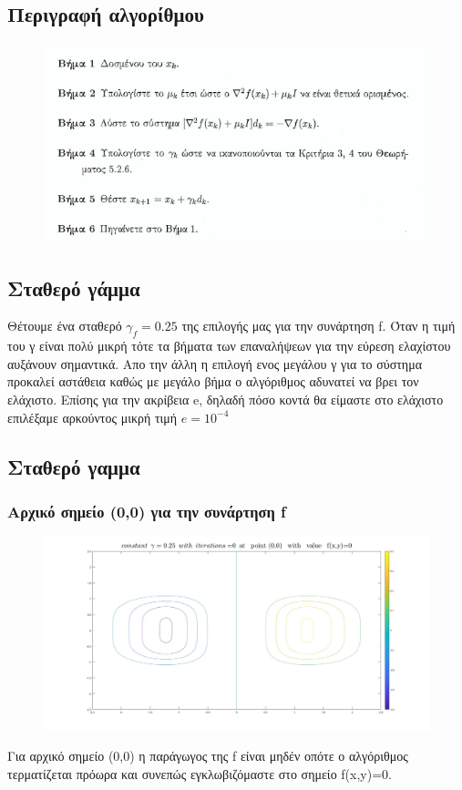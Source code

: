 \documentclass{article}
\begin{document}
\subsection*{Περιγραφή αλγορίθμου}
\begin{figure}[h!]	
     \centering  
     \advance\leftskip-0.2cm  
  \includegraphics[width=130mm,scale=2]{desc1.png}
\end{figure} 
\subsection*{Σταθερό γάμμα}
Θέτουμε ένα σταθερό $\boxed{γ_f=0.25}$ της επιλογής μας για την συνάρτηση f.  Όταν η τιμή του γ είναι πολύ μικρή τότε τα βήματα των επαναλήψεων για την εύρεση ελαχίστου αυξάνουν σημαντικά. Απο την άλλη η επιλογή ενος μεγάλου γ για το σύστημα προκαλεί αστάθεια καθώς με μεγάλο βήμα ο αλγόριθμος αδυνατεί να βρει τον ελάχιστο. Επίσης για την ακρίβεια e, δηλαδή πόσο κοντά θα είμαστε στο ελάχιστο επιλέξαμε αρκούντος μικρή τιμή $\boxed{e = 10^{-4}}$
\clearpage
\subsection*{Σταθερό γαμμα}
\subsubsection*{Αρχικό σημείο (0,0) για την συνάρτηση f}
\begin{figure}[h!]	
     \centering  
     \advance\leftskip-0.2cm  
  \includegraphics[width=130mm,scale=2]{l1.jpg}
\end{figure} 
Για αρχικό σημείο (0,0) η παράγωγος της f είναι μηδέν οπότε ο αλγόριθμος τερματίζεται πρόωρα και συνεπώς εγκλωβιζόμαστε στο σημείο f(x,y)=0.
\end{document}
